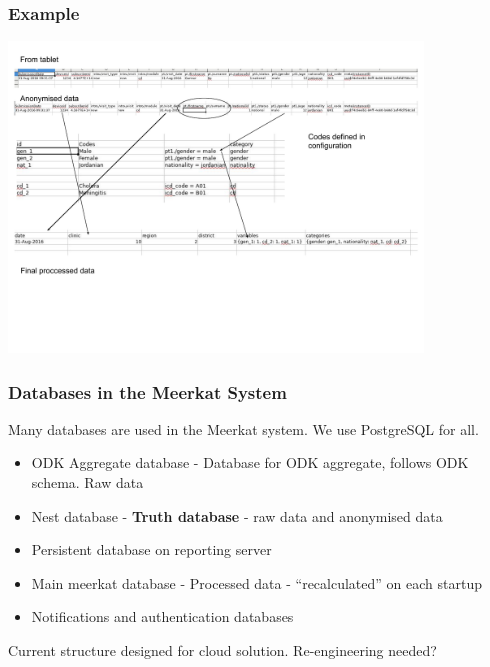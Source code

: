 \documentclass{beamer}
\begin{document}
\begin{frame}
   \frametitle{Example}
  \begin{center}
    \includegraphics[width=11cm]{ex.pdf}
  \end{center}

\end{frame}

\begin{frame}
  \frametitle{Databases in the Meerkat System}

  Many databases are used in the Meerkat system. We use PostgreSQL for all.
  \begin{itemize}
  \item ODK Aggregate database - Database for ODK aggregate, follows ODK schema. Raw data
  \item Nest database - {\bf Truth database} - raw data and anonymised data
  \item Persistent database on reporting server
  \item Main meerkat database - Processed data - ``recalculated'' on each startup
  \item Notifications and authentication databases
  \end{itemize}
  Current structure designed for cloud solution. Re-engineering needed?
\end{frame}
\end{document}
